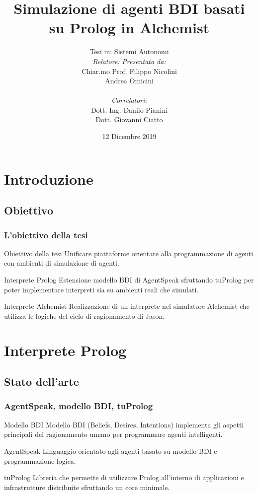 \documentclass[handout]{beamer}\mode<presentation>{\usetheme{AMSCesenaBleu}}
\title[Prolog BDI agents on Alchemist]{Simulazione di agenti BDI basati su Prolog in Alchemist}
\author[Filippo Nicolini]{Tesi in: Sistemi Autonomi\\
[0.5cm]
\textit{Relatore:} \hspace{6.55cm} \textit{Presentata da:}\\
Chiar.mo Prof. \hspace{5.5cm} Filippo Nicolini\\
Andrea Omicini \hspace{7.6cm} \phantom{g}\\
\textit{\\Correlatori:} \hspace{8.25cm} \phantom{g}\\
Dott. Ing. Danilo Pianini \hspace{6cm} \phantom{g}\\
Dott. Giovanni Ciatto \hspace{6.5cm} \phantom{g}\\
}
\institute[]{
\textsc{Alma Mater Studiorum} -- Università di Bologna \\
Campus di Cesena}
\date{12 Dicembre 2019}
\begin{document}
\maketitle


\section{Introduzione}

\subsection{Obiettivo}
\begin{frame}
\frametitle{L'obiettivo della tesi}
\begin{block}{Obiettivo della tesi}
\alert{Unificare} piattaforme orientate alla \alert{programmazione di agenti} con ambienti di \alert{simulazione di agenti}.
\end{block}

\begin{block}{Interprete Prolog}
Estensione modello BDI di AgentSpeak sfruttando tuProlog per poter implementare interpreti sia su ambienti reali che simulati.
\end{block}

\begin{block}{Interprete Alchemist}
Realizzazione di un interprete nel simulatore Alchemist che utilizza le logiche del ciclo di ragionamento di Jason.
\end{block}
\end{frame}


\section{Interprete Prolog}

\subsection{Stato dell'arte}

\begin{frame}
\frametitle{AgentSpeak, modello BDI, tuProlog}
\begin{block}{Modello BDI}
Modello BDI (Beliefs, Desires, Intentions) implementa gli aspetti principali del ragionamento umano per programmare agenti intelligenti.
\end{block}
\begin{block}{AgentSpeak}
Linguaggio orientato agli agenti basato su modello BDI e programmazione logica.
\end{block}
\begin{block}{tuProlog}
Libreria che permette di utilizzare Prolog all'interno di applicazioni e infrastrutture distribuite sfruttando un core minimale.
\end{block}

\end{frame}
\end{document}

